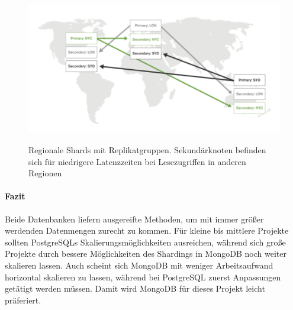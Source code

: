\begin{figure}
	\centering
    \includegraphics[width=\textwidth]{sources/MongoDB_sharded.png}\cite{MG10}
	\caption{Regionale Shards mit Replikatgruppen. Sekundärknoten befinden sich für niedrigere Latenzzeiten bei Lesezugriffen in anderen Regionen}
	\label{figDB1}
\end{figure}

\paragraph{Fazit\\} %
Beide Datenbanken liefern ausgereifte Methoden, um mit immer größer werdenden Datenmengen zurecht zu kommen.
Für kleine bis mittlere Projekte sollten PostgreSQLs Skalierungsmöglichkeiten ausreichen, während sich große Projekte durch bessere Möglichkeiten des Shardings in MongoDB noch weiter skalieren lassen.
Auch scheint sich MongoDB mit weniger Arbeitsaufwand horizontal skalieren zu lassen, während bei PostgreSQL zuerst Anpassungen getätigt werden müssen. %
Damit wird MongoDB für dieses Projekt leicht präferiert.

